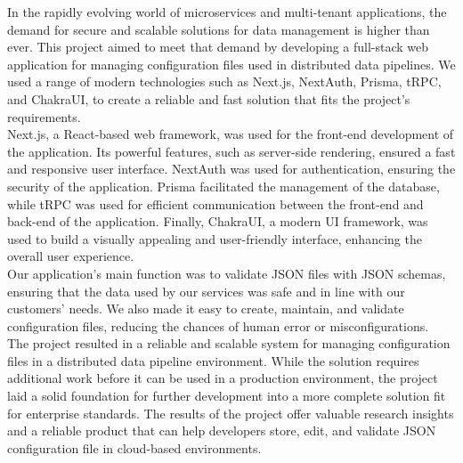 
\noindent
In the rapidly evolving world of microservices and multi-tenant applications, the demand for secure and scalable solutions for data management is higher than ever. This project aimed to meet that demand by developing a full-stack web application for managing configuration files used in distributed data pipelines. We used a range of modern technologies such as Next.js, NextAuth, Prisma, tRPC, and ChakraUI, to create a reliable and fast solution that fits the project's requirements. \\

\noindent
Next.js, a React-based web framework, was used for the front-end development of the application. Its powerful features, such as server-side rendering, ensured a fast and responsive user interface. NextAuth was used for authentication, ensuring the security of the application. Prisma facilitated the management of the database, while tRPC was used for efficient communication between the front-end and back-end of the application. Finally, ChakraUI, a modern UI framework, was used to build a visually appealing and user-friendly interface, enhancing the overall user experience. \\

\noindent 
Our application's main function was to validate JSON files with JSON schemas, ensuring that the data used by our services was safe and in line with our customers' needs. We also made it easy to create, maintain, and validate configuration files, reducing the chances of human error or misconfigurations. \\

\noindent
The project resulted in a reliable and scalable system for managing configuration files in a distributed data pipeline environment. While the solution requires additional work before it can be used in a production environment, the project laid a solid foundation for further development into a more complete solution fit for enterprise standards. The results of the project offer valuable research insights and a reliable product that can help developers store, edit, and validate JSON configuration file in cloud-based environments.



